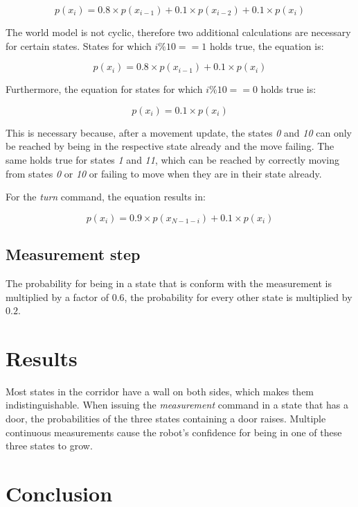 \documentclass[10pt,a4paper]{article}
\begin{document}
		\begin{displaymath}
			p(x_i) = 0.8\times p(x_{i-1}) + 0.1\times p(x_{i-2}) + 0.1\times p(x_i)
		\end{displaymath}
		
		The world model is not cyclic, therefore two additional calculations are necessary for certain states.
		States for which $i\%10==1$ holds true, the equation is:
		
		\begin{displaymath}
		p(x_i) = 0.8\times p(x_{i-1}) + 0.1\times p(x_i)
		\end{displaymath}
		
		Furthermore, the equation for states for which $i\%10==0$ holds true is:
		
		\begin{displaymath}
		p(x_i) = 0.1\times p(x_i)
		\end{displaymath}
		
		This is necessary because, after a movement update, the states \textit{0} and \textit{10} can only be reached by being in the respective state already and the move failing. The same holds true for states \textit{1} and \textit{11}, which can be reached by correctly moving from states \textit{0} or \textit{10} or failing to move when they are in their state already.
		
		For the \textit{turn} command, the equation results in:
		
		\begin{displaymath}
			p(x_i) = 0.9\times p(x_{N-1-i}) + 0.1\times p(x_i)
		\end{displaymath}
		
		\subsection{Measurement step}
		The probability for being in a state that is conform with the measurement is multiplied by a factor of $0.6$, the probability for every other state is multiplied by $0.2$.
	
	\section{Results}
	Most states in the corridor have a wall on both sides, which makes them indistinguishable.
	When issuing the \textit{measurement} command in a state that has a door, the probabilities of the three states containing a door raises. Multiple continuous measurements cause the robot's confidence for being in one of these three states to grow.
	
	\section{Conclusion}
	
\end{document}
